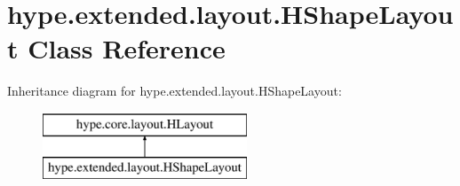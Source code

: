 \hypertarget{classhype_1_1extended_1_1layout_1_1_h_shape_layout}{\section{hype.\-extended.\-layout.\-H\-Shape\-Layout Class Reference}
\label{classhype_1_1extended_1_1layout_1_1_h_shape_layout}
}
Inheritance diagram for hype.\-extended.\-layout.\-H\-Shape\-Layout\-:\begin{figure}[H]
\begin{center}
\leavevmode
\includegraphics[height=2.000000cm]{classhype_1_1extended_1_1layout_1_1_h_shape_layout}
\end{center}
\end{figure}
